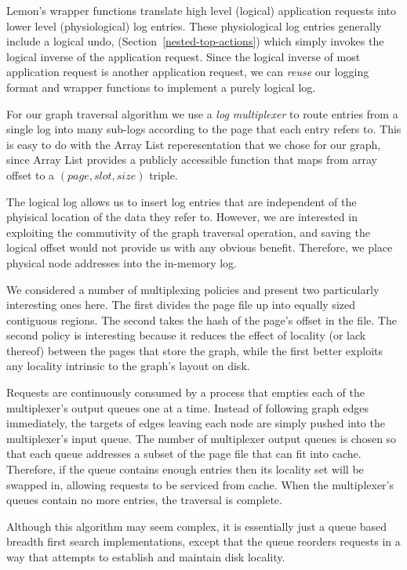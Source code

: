 \documentclass[letterpaper,twocolumn,english]{article}
\newcommand{\yad}{Lemon\xspace}
\begin{document}
\yad's wrapper functions translate high level (logical) application
requests into lower level (physiological) log entries.  These
physiological log entries generally include a logical undo,
(Section~\ref{nested-top-actions}) which simply invokes the logical
inverse of the application request.  Since the logical inverse of most
application request is another application request, we can {\em reuse} our
logging format and wrapper functions to implement a purely logical log.

For our graph traversal algorithm we use a {\em log multiplexer} to
route entries from a single log into many sub-logs according to the
page that each entry refers to.  This is easy to do with the Array
List reperesentation that we chose for our graph, since Array List
provides a publicly accessible function that maps from array offset to
a $(page, slot, size)$ triple.

The logical log allows us to insert log entries that are independent
of the phyisical location of the data they refer to.  However, we are
interested in exploiting the commutivity of the graph traversal
operation, and saving the logical offset would not provide us with any
obvious benefit.  Therefore, we place physical node addresses into the
in-memory log.

We considered a number of multiplexing policies and present two
particularly interesting ones here.  The first divides the page file
up into equally sized contiguous regions.  The second takes the hash
of the page's offset in the file.  The second policy is interesting
because it reduces the effect of locality (or lack thereof) between
the pages that store the graph, while the first better exploits any
locality intrinsic to the graph's layout on disk.

Requests are continuously consumed by a process that empties each of
the multiplexer's output queues one at a time.  Instead of following
graph edges immediately, the targets of edges leaving each node are
simply pushed into the multiplexer's input queue.  The number of
multiplexer output queues is chosen so that each queue addresses a
subset of the page file that can fit into cache.  Therefore, if the
queue contains enough entries then its locality set will be swapped
in, allowing requests to be serviced from cache.  When the
multiplexer's queues contain no more entries, the traversal is
complete.  

Although this algorithm may seem complex, it is essentially just a
queue based breadth first search implementations, except that the 
queue reorders requests in a way that attempts to establish and 
maintain disk locality.
\end{document}
